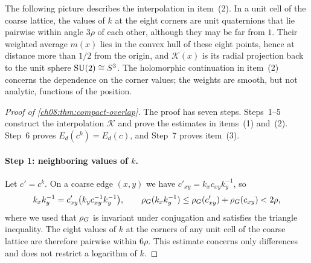 \begin{remark}\label{ch08:rem:quaternion-picture}
The following picture describes the interpolation in item~(2). In a unit cell of the coarse lattice, the values of $k$ at the eight corners are unit quaternions that lie pairwise within angle $3\rho$ of each other, although they may be far from $1$. Their weighted average $m(x)$ lies in the convex hull of these eight points, hence at distance more than $1/2$ from the origin, and $\mathscr K(x)$ is its radial projection back to the unit sphere $\mathrm{SU}(2)\cong S^3$. The holomorphic continuation in item~(2) concerns the dependence on the corner values; the weights are smooth, but not analytic, functions of the position.
\end{remark}

\begin{proof}[Proof of \cref{ch08:thm:compact-overlap}]
The proof has seven steps. Steps~1--5 construct the interpolation $\mathscr K$ and prove the estimates in items~(1) and~(2). Step~6 proves $E_d(c^k)=E_d(c)$, and Step~7 proves item~(3).

\paragraph{Step 1: neighboring values of $k$.}
Let $c'=c^k$. On a coarse edge $(x,y)$ we have $c'_{xy}=k_xc_{xy}k_y^{-1}$, so
\[
 k_xk_y^{-1}=c'_{xy}\bigl(k_yc_{xy}^{-1}k_y^{-1}\bigr),\qquad
 \rho_G(k_xk_y^{-1})
 \le\rho_G(c'_{xy})+\rho_G(c_{xy})<2\rho,
\]
where we used that $\rho_G$ is invariant under conjugation and satisfies the triangle inequality. The eight values of $k$ at the corners of any unit cell of the coarse lattice are therefore pairwise within $6\rho$. This estimate concerns only differences and does not restrict a logarithm of $k$.


\end{proof}

